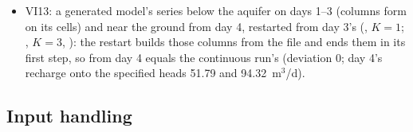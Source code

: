 \begin{itemize}
rebuilds them at rest and ends them again, but only columns that held water are counted, so the two parts' run totals
add up to the continuous run's (18 columns, 225.75~m$^3$);
\item VI13: a generated model's  series below the aquifer on days 1--3 (columns form on its cells) and
near the ground from day 4, restarted from day 3's  (, $K=1$; , $K=3$,
): the restart builds those columns from the file and ends them in its first step, so  from
day 4 equals the continuous run's (deviation 0; day 4's recharge onto the specified heads 51.79 and 94.32~m$^3$/d).
\end{itemize}

\subsection{Input handling}\label{sec:vszinputs}
